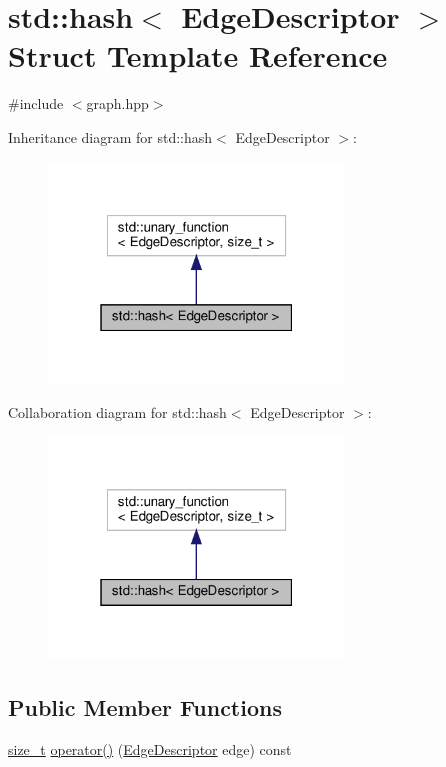 \hypertarget{structstd_1_1hash_3_01EdgeDescriptor_01_4}{}\section{std\+:\+:hash$<$ Edge\+Descriptor $>$ Struct Template Reference}
\label{structstd_1_1hash_3_01EdgeDescriptor_01_4}


{\ttfamily \#include $<$graph.\+hpp$>$}



Inheritance diagram for std\+:\+:hash$<$ Edge\+Descriptor $>$\+:
\nopagebreak
\begin{figure}[H]
\begin{center}
\leavevmode
\includegraphics[width=223pt]{d1/de0/structstd_1_1hash_3_01EdgeDescriptor_01_4__inherit__graph}
\end{center}
\end{figure}


Collaboration diagram for std\+:\+:hash$<$ Edge\+Descriptor $>$\+:
\nopagebreak
\begin{figure}[H]
\begin{center}
\leavevmode
\includegraphics[width=223pt]{db/d64/structstd_1_1hash_3_01EdgeDescriptor_01_4__coll__graph}
\end{center}
\end{figure}
\subsection*{Public Member Functions}
\begin{DoxyCompactItemize}
\item 
\hyperlink{tutorial__fpt__2017_2intro_2sixth_2test_8c_a7c94ea6f8948649f8d181ae55911eeaf}{size\+\_\+t} \hyperlink{structstd_1_1hash_3_01EdgeDescriptor_01_4_a1cc49e948ec1f4155487e2e29b5506eb}{operator()} (\hyperlink{graph_8hpp_a9eb9afea34e09f484b21f2efd263dd48}{Edge\+Descriptor} edge) const
\end{DoxyCompactItemize}


